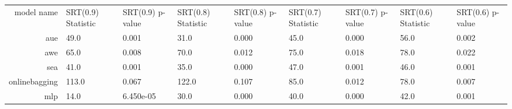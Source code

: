 \begin{tabular}{|r|l|l|l|l|l|l|l|l|}
  \hline
  model name & SRT(0.9) Statistic & SRT(0.9) p-value & SRT(0.8) Statistic & SRT(0.8) p-value & SRT(0.7) Statistic & SRT(0.7) p-value & SRT(0.6) Statistic & SRT(0.6) p-value \\ 
  aue & 49.0 & 0.001 & 31.0 & 0.000 & 45.0 & 0.000 & 56.0 & 0.002 \\ 
  awe & 65.0 & 0.008 & 70.0 & 0.012 & 75.0 & 0.018 & 78.0 & 0.022 \\ 
  sea & 41.0 & 0.001 & 35.0 & 0.000 & 47.0 & 0.001 & 46.0 & 0.001 \\ 
  onlinebagging & 113.0 & 0.067 & 122.0 & 0.107 & 85.0 & 0.012 & 78.0 & 0.007 \\ 
  mlp & 14.0 & 6.450e-05 & 30.0 & 0.000 & 40.0 & 0.000 & 42.0 & 0.001 \\ 
\end{tabular}
